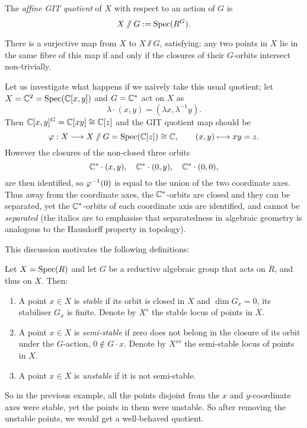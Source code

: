 \begin{defn}
	The \emph{affine GIT quotient} of $X$ with respect to an action of $G$ is
	$$
		X \sslash G := \operatorname{Spec}(R^{G}).
	$$
\end{defn}

\begin{prop}
	There is a surjective map from $X$ to $X \sslash G$, satisfying: any two points in $X$ lie in the same fibre of this map if and only if the closures of their $G$-orbits intersect non-trivially.
\end{prop}

Let us investigate what happens if we naively take this usual quotient; let $X = \mathbb{C}^{2} = \operatorname{Spec}(\mathbb{C}[x,y])$ and $G = \mathbb{C}^{\ast}$ act on $X$ as
$$
	\lambda \cdot (x,y) = (\lambda x, \lambda^{-1}y).
$$
Then $\mathbb{C}[x,y]^{G} = \mathbb{C}[xy] \cong \mathbb{C}[z]$ and the GIT quotient map should be
$$
	\varphi:X \longrightarrow X \sslash G = \operatorname{Spec}(\mathbb{C}[z]) \cong \mathbb{C},\qquad (x,y) \longmapsto xy = z.
$$
However the closures of the non-closed three orbits
$$
	\mathbb{C}^{\ast}\cdot (x,y),\quad \mathbb{C}^{\ast} \cdot (0,y),\quad \mathbb{C}^{\ast}\cdot (0,0),
$$
are then identified, so $\varphi^{-1}(0)$ is equal to the union of the two coordinate axes. Thus away from the coordinate axes, the $\mathbb{C}^{\ast}$-orbits are closed and they can be separated, yet the $\mathbb{C}^{\ast}$-orbits of each coordinate axis are identified, and cannot be \emph{separated} (the italics are to emphasise that separatedness in algebraic geometry is analogous to the Hausdorff property in topology).

This discussion motivates the following definitions:
\begin{defn}
	Let $X = \operatorname{Spec}(R)$ and let $G$ be a reductive algebraic group that acts on $R$, and thus on $X$. Then:
	\begin{enumerate}
		\item A point $x \in X$ is \emph{stable} if its orbit is closed in $X$ and $\dim G_{x} = 0$, \ie its stabiliser $G_{x}$ is finite. Denote by $X^{s}$ the stable locus of points in $X$.
		\item A point $x \in X$ is \emph{semi-stable} if zero does not belong in the closure of its orbit under the $G$-action, \ie $0 \not\in \overline{G \cdot x}$. Denote by $X^{ss}$ the semi-stable locus of points in $X$.
		\item A point $x \in X$ is \emph{unstable} if it is not semi-stable.
	\end{enumerate}
\end{defn}

So in the previous example, all the points disjoint from the $x$ and $y$-coordinate axes were stable, yet the points in them were unstable. So after removing the unstable points, we would get a well-behaved quotient.

